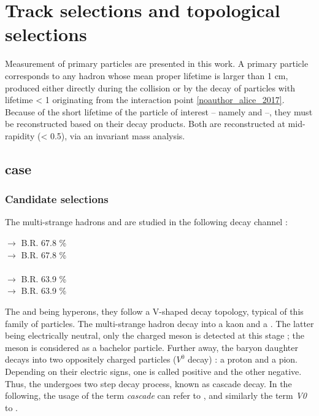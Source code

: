\section{Track selections and topological selections}
\label{sec:Section04}

Measurement of primary particles are presented in this work. A primary particle corresponds to any hadron whose mean proper lifetime is larger than 1 cm, produced either directly during the collision or by the decay of particles with lifetime \cTau < 1 \cm originating from the interaction point \ref{noauthor_alice_2017}. Because of the short lifetime of the particle of interest -- namely \rmOmega and \rmPhiMes --, they must be reconstructed based on their decay products. Both are reconstructed at mid-rapidity (\absrap < 0.5), via an invariant mass analysis.

\subsection{\rmOmega case}
\label{sec:Section04.a-}

\subsubsection{Candidate selections}

The multi-strange hadrons \rmOmegaM and \rmAomegaP are studied in the following decay channel :

\rmOmegaM [$sss$] $\rightarrow$ \rmLambda [$u d s$] \Kminus [$\bar{d} s$]  \qquad \textsc{B.R. 67.8 \%}\\
 $\rightarrow$  \Kplus [$u\bar{s}$] \qquad \textsc{B.R. 67.8 \%} \\
\\
\rmLambda [$u d s$] $\rightarrow$ \proton [$uud$] \piMinus [$\bar{u} d$] \qquad \textsc{B.R. 63.9 \%}\\
 $\rightarrow$  \piPlus [$u \bar{d}$] \qquad \textsc{B.R. 63.9 \%}

The \rmLambda and \rmOmega being hyperons, they follow a V-shaped decay topology, typical of this family of particles. The multi-strange hadron decay into a kaon and a \rmLambda. The latter being electrically neutral, only the charged meson is detected at this stage ; the meson is considered as a bachelor particle. Further away, the baryon daughter decays into two oppositely charged particles ($V^0$ decay) : a proton and a pion. Depending on their electric signs, one is called positive and the other negative. Thus, the \rmOmega undergoes two step decay process, known as cascade decay. In the following, the usage of the term \textit{cascade} can refer to \rmOmega, and similarly the term \textit{V0} to \rmLambda.


